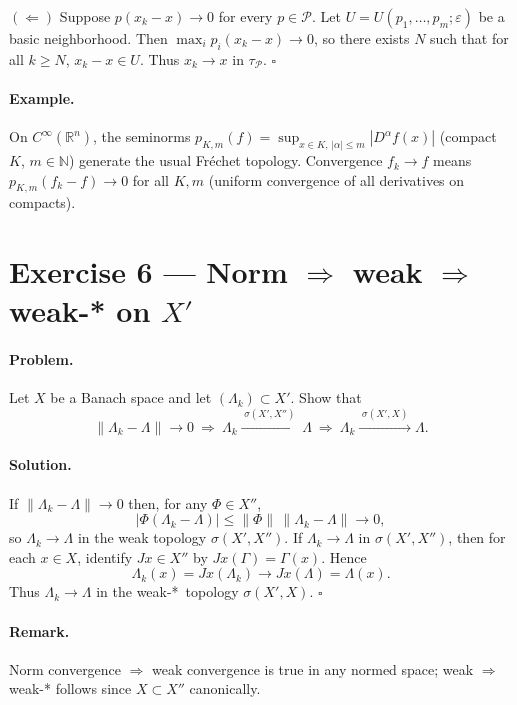 \documentclass[12pt,a4paper]{article}
\newcommand{\qed}{\hfill$\square$}
\theoremstyle{plain}
\theoremstyle{definition}
\theoremstyle{remark}
\theoremstyle{remark}
\theoremstyle{definition}
\begin{document}
	$(\Leftarrow)$ Suppose $p(x_k-x)\to0$ for every $p\in\mathcal P$. Let
	$U=U(p_1,\dots,p_m;\varepsilon)$ be a basic neighborhood. Then
	$\max_i p_i(x_k-x)\to0$, so there exists $N$ such that for all $k\ge N$,
	$x_k-x\in U$. Thus $x_k\to x$ in $\tau_{\mathcal P}$. \qed
	
	\paragraph{Example.}
	On $C^\infty(\mathbb R^n)$, the seminorms
	$p_{K,m}(f)=\sup_{x\in K,\,|\alpha|\le m}|D^\alpha f(x)|$ (compact $K$, $m\in\mathbb N$)
	generate the usual Fréchet topology. Convergence $f_k\to f$ means
	$p_{K,m}(f_k-f)\to0$ for all $K,m$ (uniform convergence of all derivatives on compacts).
	
	\bigskip
	
	\section*{Exercise 6 — Norm $\Rightarrow$ weak $\Rightarrow$ weak-* on $X'$}
	
	\paragraph{Problem.}
	Let $X$ be a Banach space and let $(\Lambda_k)\subset X'$. Show that
	\[
	\|\Lambda_k-\Lambda\|\to0 \ \Longrightarrow\ \Lambda_k \xrightarrow{\;\sigma(X',X'')\;} \Lambda
	\ \Longrightarrow\ \Lambda_k \xrightarrow{\;\sigma(X',X)\;} \Lambda .
	\]
	
	\paragraph{Solution.}
	If $\|\Lambda_k-\Lambda\|\to0$ then, for any $\Phi\in X''$,
	\[
	|\Phi(\Lambda_k-\Lambda)| \le \|\Phi\|\,\|\Lambda_k-\Lambda\| \to 0,
	\]
	so $\Lambda_k\to\Lambda$ in the weak topology $\sigma(X',X'')$.
	If $\Lambda_k\to\Lambda$ in $\sigma(X',X'')$, then for each $x\in X$,
	identify $Jx\in X''$ by $Jx(\Gamma)=\Gamma(x)$. Hence
	\[
	\Lambda_k(x)=Jx(\Lambda_k) \longrightarrow Jx(\Lambda)=\Lambda(x).
	\]
	Thus $\Lambda_k\to\Lambda$ in the weak-*\ topology $\sigma(X',X)$. \qed
	
	\paragraph{Remark.}
	Norm convergence $\Rightarrow$ weak convergence is true in any normed space;
	weak $\Rightarrow$ weak-* follows since $X\subset X''$ canonically.
	
\end{document}
